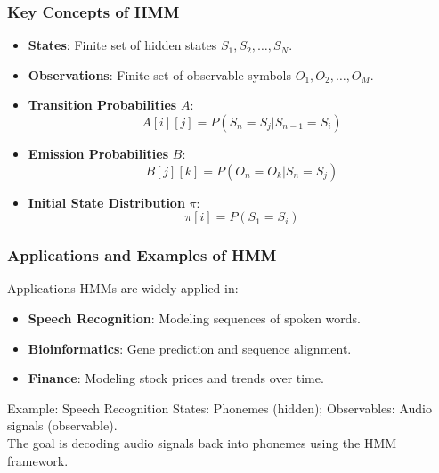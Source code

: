 \documentclass[aspectratio=169]{beamer}
\begin{document}
\begin{frame}[fragile]
    \frametitle{Key Concepts of HMM}
    \begin{itemize}
        \item \textbf{States}: Finite set of hidden states \( S_1, S_2, \ldots, S_N \).
        \item \textbf{Observations}: Finite set of observable symbols \( O_1, O_2, \ldots, O_M \).
        \item \textbf{Transition Probabilities} \( A \):
            \[
            A[i][j] = P(S_{n} = S_j | S_{n-1} = S_i)
            \]
        \item \textbf{Emission Probabilities} \( B \):
            \[
            B[j][k] = P(O_n = O_k | S_n = S_j)
            \]
        \item \textbf{Initial State Distribution} \( \pi \):
            \[
            \pi[i] = P(S_1 = S_i)
            \]
    \end{itemize}
\end{frame}

\begin{frame}[fragile]
    \frametitle{Applications and Examples of HMM}
    \begin{block}{Applications}
        HMMs are widely applied in:
        \begin{itemize}
            \item \textbf{Speech Recognition}: Modeling sequences of spoken words.
            \item \textbf{Bioinformatics}: Gene prediction and sequence alignment.
            \item \textbf{Finance}: Modeling stock prices and trends over time.
        \end{itemize}
    \end{block}
    
    \begin{block}{Example: Speech Recognition}
        States: Phonemes (hidden); Observables: Audio signals (observable).\\
        The goal is decoding audio signals back into phonemes using the HMM framework.
    \end{block}
\end{frame}
\end{document}
